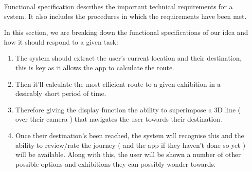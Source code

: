 

Functional specification describes the important technical requirements for a system. It also includes the procedures in which the requirements have been met.

In this section, we are breaking down the functional specifications of our idea and how it should respond to a given task:


\begin{enumerate}
    \item The system should extract the user's current location and their destination, this is key as it allows the app to calculate the route.
    \item  Then it'll calculate the most efficient route to a given exhibition in a desirably short period of time.
    \item  Therefore giving the display function the ability to superimpose a 3D line ( over their camera ) that navigates the user towards their destination. 
    \item Once their destination's been reached, the system will recognise this and the ability to review/rate the journey ( and the app if they haven't done so yet ) will be available. Along with this, the user will be shown a number of other possible options and exhibitions they can possibly wonder towards.
\end{enumerate}
                                      
